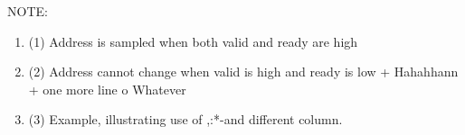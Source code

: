 \documentclass[landscape,draft]{report}
\begin{document}
\par {\ttfamily\scriptsize{NOTE:}
\begin{enumerate}{}
\setlength{\leftskip}{2.3cm}
\ttfamily\scriptsize
\item (1) Address is sampled when both valid and ready are high
\item (2) Address cannot change when valid is high and ready is low
\subitem\hspace{1em}+ Hahahhann
\subitem\hspace{1em}+ one more line
\subitem\hspace{1em} o Whatever
\item (3) Example, illustrating use of ,:*-and different column.
\end{enumerate}
}
\end{document}
